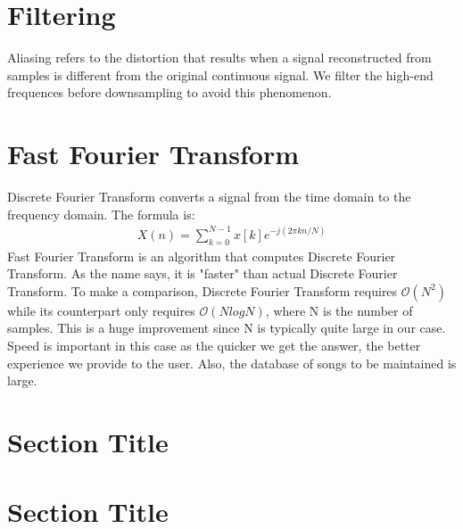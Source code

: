\documentclass[12pt, a4paper]{IEEEtran}
\begin{document}
\section{Filtering}
Aliasing refers to the distortion that results when a signal reconstructed from samples is different from the original continuous signal.
We filter the high-end frequences before downsampling to avoid this phenomenon.

\section{Fast Fourier Transform}
Discrete Fourier Transform converts a signal from the time domain to the frequency domain. The formula is:
\begin{align*}
    X(n) = \sum_{k=0}^{N-1} x[k] e^{-j(2\pi kn/N)}
\end{align*}
Fast Fourier Transform is an algorithm that computes Discrete Fourier Transform. As the name says, it is "faster" than actual Discrete Fourier Transform. To make a comparison, Discrete Fourier Transform requires \(\mathcal{O}(N^2)\) while its counterpart only requires \(\mathcal{O}(NlogN)\), where N is the number of samples. This is a huge improvement since N is typically quite large in our case.\\
Speed is important in this case as the quicker we get the answer, the better experience we provide to the user.
Also, the database of songs to be maintained is large.

\vspace*{-2cm}
\section{Section Title}
\vspace*{-1cm}
\blindtext

\section{Section Title}
\blindtext

\pagebreak

    
    
\end{document}
